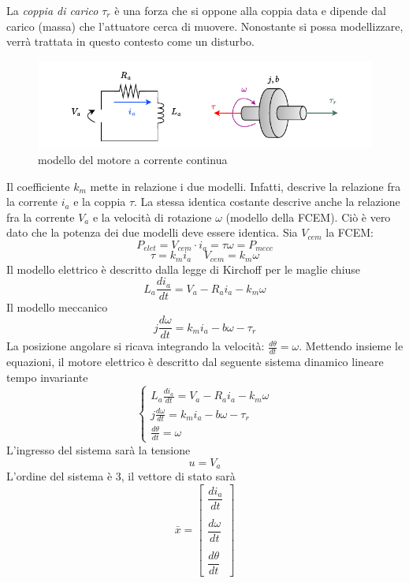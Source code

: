 \documentclass[10pt, letterpaper]{report}
\begin{document}
La \textit{coppia di carico} $\tau_r$ è una forza che si oppone alla coppia data e dipende dal carico (massa) che l'attuatore cerca di muovere. Nonostante si possa modellizzare, verrà trattata in questo contesto come un disturbo.
\begin{center}
    \begin{figure}[h!]
        \centering
        \includegraphics[width=1\textwidth ]{images/modelloDcDisegno.pdf}
        \caption{modello del motore a corrente continua}
        \label{dcModel}
    \end{figure}
\end{center}
Il coefficiente $k_m$ mette in relazione i due modelli. Infatti, descrive la relazione fra la corrente $i_a$ e la coppia $\tau$. La stessa identica costante descrive anche la relazione fra la corrente 
$V_a$ e la velocità di rotazione $\omega$ (modello della FCEM). Ciò è vero dato che la potenza dei due modelli deve essere identica. Sia $V_{cem}$ la FCEM: $$ P_{elet}=V_{cem}\cdot i_a=\tau\omega=P_{mecc}$$
$$ \tau = k_m i_a \ \ \ \ \ V_{cem}=k_m\omega$$
Il modello elettrico è descritto dalla legge di Kirchoff per le maglie chiuse
$$ L_a\frac{di_a}{dt}=V_a-R_ai_a-k_m\omega$$
Il modello meccanico 
$$ j\frac{d\omega}{dt}=k_mi_a-b\omega-\tau_r$$
La posizione angolare si ricava integrando la velocità: $\frac{d\theta}{dt}=\omega$. Mettendo insieme le equazioni, il motore elettrico è descritto dal seguente sistema dinamico lineare tempo invariante$$ \begin{cases}
    L_a\frac{di_a}{dt}=V_a-R_ai_a-k_m\omega\\ 
    j\frac{d\omega}{dt}=k_mi_a-b\omega-\tau_r\\ 
    \frac{d\theta}{dt}=\omega
\end{cases}$$ 
L'ingresso del sistema sarà la tensione 
$$ u=V_a$$
L'ordine del sistema è 3, il vettore di stato sarà 
$$ \bar x = \begin{bmatrix}
    \dfrac{di_a}{dt} \\ \\ \dfrac{d\omega}{dt} \\ \\\dfrac{d\theta}{dt}
\end{bmatrix}$$
\end{document}
